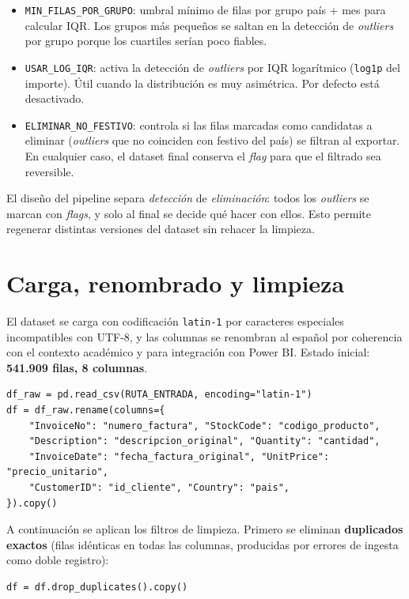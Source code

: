 \documentclass[11pt,a4paper]{article}
\begin{document}
\begin{itemize}
    \item \texttt{MIN\_FILAS\_POR\_GRUPO}: umbral mínimo de filas por grupo país + mes para calcular IQR. Los grupos más pequeños se saltan en la detección de \textit{outliers} por grupo porque los cuartiles serían poco fiables.
    \item \texttt{USAR\_LOG\_IQR}: activa la detección de \textit{outliers} por IQR logarítmico (\texttt{log1p} del importe). Útil cuando la distribución es muy asimétrica. Por defecto está desactivado.
    \item \texttt{ELIMINAR\_NO\_FESTIVO}: controla si las filas marcadas como candidatas a eliminar (\textit{outliers} que no coinciden con festivo del país) se filtran al exportar. En cualquier caso, el dataset final conserva el \textit{flag} para que el filtrado sea reversible.
\end{itemize}

El diseño del pipeline separa \textit{detección} de \textit{eliminación}: todos los \textit{outliers} se marcan con \textit{flags}, y solo al final se decide qué hacer con ellos. Esto permite regenerar distintas versiones del dataset sin rehacer la limpieza.

\section{Carga, renombrado y limpieza}

El dataset se carga con codificación \texttt{latin-1} por caracteres especiales incompatibles con UTF-8, y las columnas se renombran al español por coherencia con el contexto académico y para integración con Power BI. Estado inicial: \textbf{541.909 filas, 8 columnas}.

\begin{lstlisting}
df_raw = pd.read_csv(RUTA_ENTRADA, encoding="latin-1")
df = df_raw.rename(columns={
    "InvoiceNo": "numero_factura", "StockCode": "codigo_producto",
    "Description": "descripcion_original", "Quantity": "cantidad",
    "InvoiceDate": "fecha_factura_original", "UnitPrice": "precio_unitario",
    "CustomerID": "id_cliente", "Country": "pais",
}).copy()
\end{lstlisting}

A continuación se aplican los filtros de limpieza. Primero se eliminan \textbf{duplicados exactos} (filas idénticas en todas las columnas, producidas por errores de ingesta como doble registro):

\begin{lstlisting}
df = df.drop_duplicates().copy()
\end{lstlisting}
\end{document}
